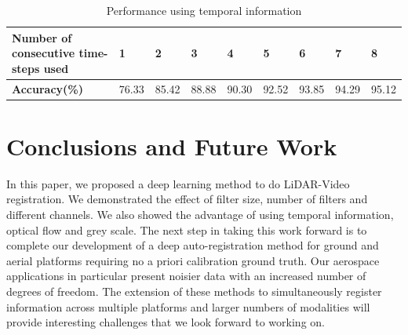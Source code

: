 \documentclass{article}
\begin{document}
\begin{table}[htbp]
\small
\caption{Performance using temporal information}
\begin{center}
     \begin{tabular}{ | p{4cm} | l | l | l | l | l | l | l | l |} \hline
     \textbf{Number of consecutive time-steps used} & \textbf{1} & \textbf{2} & \textbf{3} & \textbf{4} & \textbf{5} & \textbf{6} & \textbf{7} & \textbf{8} \\ \hline
     \textbf{Accuracy(\%)} & 76.33 & 85.42 & 88.88 & 90.30 & 92.52 & 93.85 & 94.29 & 95.12\\ \hline
     \end{tabular}
     \label{table:temporal_performance}
\end{center}
\end{table}




\section{Conclusions and Future Work} %
\label{sec:conclusions_and_future_work}
In this paper, we proposed a deep learning method to do LiDAR-Video registration. We demonstrated the effect of filter size, number of filters and different channels. We also showed the advantage of using temporal information, optical flow and grey scale.
The next step in taking this work forward is to complete our development of a deep auto-registration method for ground and aerial platforms requiring no a priori calibration ground truth.  Our aerospace applications in particular present noisier data with an increased number of degrees of freedom. The extension of these methods to simultaneously register information across multiple platforms and larger numbers of modalities will provide interesting challenges that we look forward to working on. 






\end{document}
